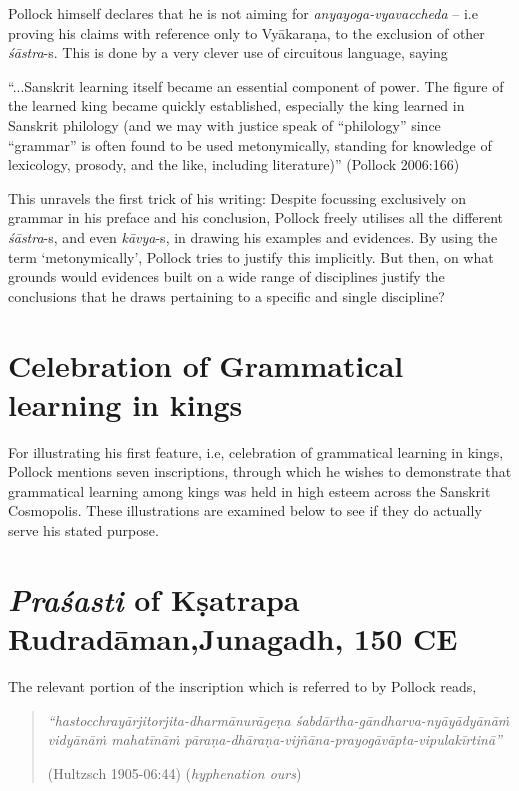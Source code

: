 Pollock himself declares that he is not aiming for {\sl anyayoga-vyavaccheda} -- i.e proving his claims with reference only to Vyākaraṇa, to the exclusion of other {\sl śāstra}-s. This is done by a very clever use of circuitous language, saying 
\begin{myquote}
``...Sanskrit learning itself became an essential component of power. The figure of the learned king became quickly established, especially the king learned in Sanskrit philology (and we may with justice speak of ``philology'' since ``grammar'' is often found to be used metonymically, standing for knowledge of lexicology, prosody, and the like, including literature)''
\hfill (Pollock 2006:166)
\end{myquote}

This unravels the first trick of his writing: Despite focussing exclusively on grammar in his preface and his conclusion, Pollock freely utilises all the different {\sl śāstra}-s, and even {\sl kāvya}-s, in drawing his examples and evidences. By using the term `metonymically', Pollock tries to justify this implicitly. But then, on what grounds would evidences built on a wide range of disciplines justify the conclusions that he draws pertaining to a specific and single discipline?

\section*{Celebration of Grammatical learning in kings}

For illustrating his first feature, i.e, celebration of grammatical learning in kings, Pollock mentions seven inscriptions, through which he wishes to demonstrate that grammatical learning among kings was held in high esteem across the Sanskrit Cosmopolis. These illustrations are examined below to see if they do actually serve his stated purpose. 

\section{{\sl\bfseries Praśasti} of Kṣatrapa Rudradāman,\newline Junagadh, 150 CE}\label{chap3-sec1}

The relevant portion of the inscription which is referred to by Pollock reads,
\begin{quote}
{{\sl ``hastocchrayārjitorjita-dharmānurāgeṇa śabdārtha-gāndharva-nyāyādyānāṁ vidyānāṁ mahatīnāṁ pāraṇa-dhāraṇa-vijñāna-prayogāvāpta-vipulakīrtinā''}}

\hfill (Hultzsch 1905-06:44) ({\sl hyphenation ours})
\end{quote}

